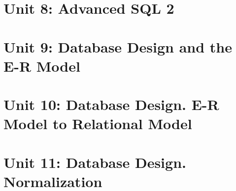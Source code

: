 \documentclass[catalan, a4paper, 12pt, titlepage]{article}
\begin{document}




\section{Unit 8: Advanced SQL 2}








\section{Unit 9: Database Design and the E-R Model}

%





\section{Unit 10: Database Design. E-R Model to Relational Model}

%




\section{Unit 11: Database Design. Normalization}
\end{document}
